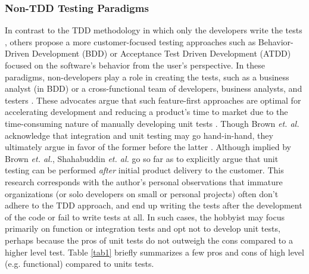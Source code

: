 \documentclass[10pt, conference]{IEEEtran}
\begin{document}
\subsubsection{Non-TDD Testing Paradigms}\label{sec:intro-}
In contrast to the TDD methodology in which only the developers write the tests
\cite{axelrod2018unit}, 
others \cite{brown2013agility, shahabuddin2016integration, moe2019comparative} propose a 
more customer-focused testing approaches such as Behavior-Driven Development (BDD)
or Acceptance Test Driven Development (ATDD) focused on the software's behavior 
from the user's perspective. In these paradigms, non-developers play a role 
in creating the tests, such as a business analyst (in BDD) \cite{barus2019implementation}
or a cross-functional team of developers, business analysts, and testers \cite{pugh2010lean}.
These advocates argue that such feature-first approaches are optimal for accelerating development 
and reducing a product's time to market due to the time-consuming nature of manually
developing unit tests \cite{kahur2023java, shahabuddin2016integration}.
Though Brown \textit{et. al.} acknowledge that integration and unit
testing may go hand-in-hand, they 
ultimately argue in favor of the former before the latter \cite{brown2013agility}.  
Although implied by Brown \textit{et. al.}, Shahabuddin \textit{et. al.} 
\cite{shahabuddin2016integration} go so far as to explicitly argue that unit
testing can be performed \textit{after} initial product delivery to the customer.
This research corresponds with the author’s personal observations that immature 
organizations (or solo developers on small or personal projects)
often don’t adhere to the  TDD approach, and end up writing the tests 
after the development of the code or fail to write tests at all. In such cases,
the hobbyist may focus primarily on function or integration tests
and opt not to develop unit tests, perhaps because the pros of unit tests
do not outweigh the cons compared to a higher level test.
Table \ref{tab1} briefly summarizes a few pros and cons of high level 
(e.g. functional) compared to units tests.
\end{document}
